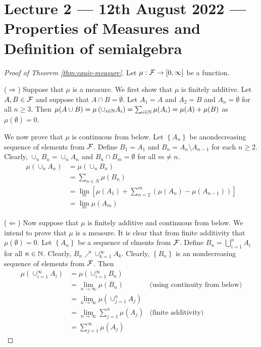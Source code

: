 \section{Lecture 2 --- 12th August 2022 --- Properties of Measures and Definition of semialgebra}
\begin{proof}[Proof of Theorem \ref{thm:equiv-measure}] 
    Let $\mu : {\cal F} \to [0,\infty]$ be a function.

    ($\Rightarrow$) Suppose that $\mu$ is a measure. We first show that $\mu$ is finitely additive. Let $A, B \in {\cal F}$ and suppose that $A\cap B=\emptyset$. Let $A_1 =A $ and $A_2 =B$ and $A_n = \emptyset$ for all $n\ge 3$. Then $\mu (A\cup B) = \mu \left( \cup_{i\in\mathbb N} A_i \right) = \sum_{i\in\mathbb N} \mu (A_i) = \mu (A) + \mu (B)$ as $\mu (\emptyset ) =0$. 

    We now prove that $\mu$ is continuous from below. Let $\left\{ A_n \right\}$ be anondecreasing sequence of elements from ${\cal F}$. Define $B_1=A_1$ and $B_n = A_n \setminus A_{n-1}$ for each $n\ge 2$. Clearly, $\cup_n B_n = \cup_n A_n$ and $B_n \cap B_m = \emptyset$ for all $m\ne n$.
    \begin{align*}
\mu \left( \cup_n A_n \right)&= \mu \left( \cup_n B_n \right) \\
&= \sum_{n\in N} \mu \left( B_n \right) \\
&=  \lim_{m} \left[\mu (A_1) +\sum_{n=2}^{m} \left(\mu \left( A_n \right) - \mu \left( A_{n-1} \right)\right)\right] \\
&= \lim_{m} \mu (A_m)
\end{align*}

($\Leftarrow$) Now suppose that $\mu$ is finitely additive and continuous from below.
We intend to prove that $\mu$ is a measure. It is clear that from finite additivity that $\mu \left( \emptyset \right) = 0$.  Let $\left\{ A_n \right\}$ be a sequence of elments from ${\cal F}$. Define $B_n = \bigcup_{i=1}^{n} A_i$ for all $n\in \mathbb N$. Clearly, $B_n \nearrow \cup_{k=1}^{\infty} A_k$. Clearly, $\left\{ B_n \right\}$ is an nondecreasing sequence of elements from ${\cal F}$. Then
\begin{align*}
    \mu \left( \cup_{i=1}^{\infty} A_i \right) &= \mu \left( \cup_{i=1}^{\infty} B_n \right) &\\
    &= \lim_{n\to\infty} \mu\left( B_n \right) & \text{(using continuity from below)} \\
    &= \lim_{n\to\infty} \mu \left( \cup_{j=1}^{n} A_j \right) & \\
    &= \lim_{n\to\infty} \sum_{j=1}^{n} \mu \left( A_j \right) & \text{(finite additivity)} \\
    &= \sum_{j=1}^{\infty} \mu (A_j) 
\end{align*}
\end{proof}

